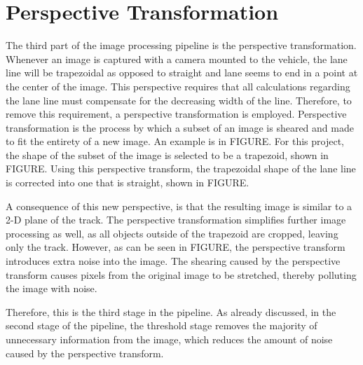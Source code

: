 \documentclass[arbeit=studie,oneside,BCOR=12mm]{ArbeitRST}
\begin{document}
\section{Perspective Transformation}
The third part of the image processing pipeline is the perspective transformation. 
 Whenever an image is captured with a camera mounted to the vehicle, the lane 
 line will be trapezoidal as opposed to straight and lane seems to end in a 
 point at the center of the image. This perspective requires that all calculations 
 regarding the lane line must compensate for the decreasing width of the line. 
 Therefore, to remove this requirement, a perspective transformation is employed. Perspective transformation is the process 
 by which a subset of an image is sheared and made to fit the entirety of a new 
 image. An example is in FIGURE. For this project, the shape of the subset of the 
 image is selected to be a trapezoid, shown in FIGURE. 
 Using this perspective transform, the trapezoidal shape of the lane line is corrected 
 into one that is straight, shown in FIGURE.
 
 A consequence of this new perspective, is that the resulting 
 image is similar to a 2-D plane of the track. The perspective transformation 
 simplifies further image processing as well, as all objects outside of the trapezoid 
 are cropped, leaving only the track. However, as can be seen in FIGURE, the perspective transform introduces extra noise into the image. The shearing caused by the perspective transform causes pixels from the original image to be stretched, thereby polluting the image with noise. 

 Therefore, this is the third stage in the pipeline. As already discussed, in the second stage of the pipeline, the threshold stage removes the majority of unnecessary information from the image, which reduces the amount of noise caused by the perspective transform.
\end{document}
